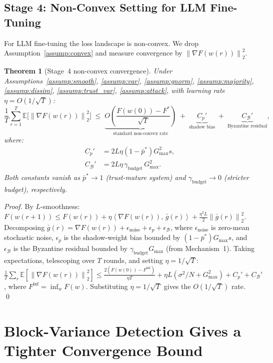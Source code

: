 \documentclass{article}
\newtheorem{theorem}{Theorem}
\newcommand{\E}{\mathbb{E}}
\newcommand{\norm}[1]{\left\lVert #1 \right\rVert}
\newcommand{\inner}[2]{\left\langle #1,\, #2 \right\rangle}
\newcommand{\calB}{\mathcal{B}}
\newcommand{\gF}{\nabla F}
\begin{document}
\subsection{Stage 4: Non-Convex Setting for LLM Fine-Tuning}
\label{sec:stage4}

For LLM fine-tuning the loss landscape is non-convex.
We drop Assumption~\ref{assump:convex} and measure convergence by
$\norm{\gF(w(r))}_2^2$.

\begin{theorem}[Stage~4 non-convex convergence]
\label{thm:stage4}
Under Assumptions~\ref{assump:smooth}, \ref{assump:var}, \ref{assump:gnorm},
\ref{assump:majority}, \ref{assump:dissim}, \ref{assump:trust_var},
\ref{assump:attack}, with learning rate $\eta = O(1/\sqrt{T})$:
\[
  \frac{1}{T}\sum_{r=1}^T \E\bigl[\norm{\gF(w(r))}_2^2\bigr]
  \;\leq\;
  \underbrace{O\!\left(\frac{F(w(0)) - F^*}{\sqrt{T}}\right)}_{\text{standard non-convex rate}}
  \;+\;
  \underbrace{C_p'}_{\text{shadow bias}}
  \;+\;
  \underbrace{C_\calB'}_{\text{Byzantine residual}},
\]
where:
\begin{align*}
  C_p' &= 2L\eta(1-\bar{p}^*)G_{\max}^2 s,\\
  C_\calB' &= 2L\eta\,\gamma_{\mathrm{budget}}\,G_{\max}^2.
\end{align*}
Both constants vanish as $\bar{p}^* \to 1$ (trust-mature system) and
$\gamma_{\mathrm{budget}} \to 0$ (stricter budget), respectively.
\end{theorem}

\begin{proof}
By $L$-smoothness:
$F(w(r+1)) \leq F(w(r)) + \eta\inner{\gF(w(r))}{\bar{g}(r)} + \frac{\eta^2 L}{2}\norm{\bar{g}(r)}_2^2$.
Decomposing $\bar{g}(r) = \gF(w(r)) + \epsilon_{\mathrm{noise}} + \epsilon_p + \epsilon_\calB$,
where $\epsilon_{\mathrm{noise}}$ is zero-mean stochastic noise,
$\epsilon_p$ is the shadow-weight bias bounded by $(1-\bar{p}^*)G_{\max}s$,
and $\epsilon_\calB$ is the Byzantine residual bounded by
$\gamma_{\mathrm{budget}}G_{\max}$ (from Mechanism~1).
Taking expectations, telescoping over $T$ rounds, and setting $\eta = 1/\sqrt{T}$:
$\frac{1}{T}\sum_r\E[\norm{\gF(w(r))}_2^2]
\leq \frac{2(F(w(0)) - F^{\mathrm{inf}})}{\eta T}
+ \eta L(\sigma^2/N + G_{\max}^2) + C_p' + C_\calB'$,
where $F^{\mathrm{inf}} = \inf_w F(w)$.
Substituting $\eta = 1/\sqrt{T}$ gives the $O(1/\sqrt{T})$ rate.
\qed
\end{proof}

\section{Block-Variance Detection Gives a Tighter Convergence Bound}
\label{sec:comparison}
\end{document}
